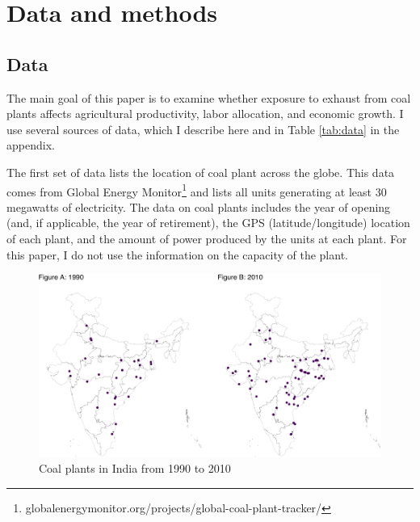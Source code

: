 \documentclass[
]{article}
\begin{document}
\hypertarget{data-and-methods}{%
\section{Data and methods}\label{data-and-methods}}

\label{data}

\hypertarget{data}{%
\subsection{Data}\label{data}}

\label{data2}

The main goal of this paper is to examine whether exposure to exhaust from coal plants affects agricultural productivity, labor allocation, and economic growth. I use several sources of data, which I describe here and in Table \ref{tab:data} in the appendix.

The first set of data lists the location of coal plant across the globe. This data comes from Global Energy Monitor\footnote{globalenergymonitor.org/projects/global-coal-plant-tracker/} and lists all units generating at least 30 megawatts of electricity. The data on coal plants includes the year of opening (and, if applicable, the year of retirement), the GPS (latitude/longitude) location of each plant, and the amount of power produced by the units at each plant. For this paper, I do not use the information on the capacity of the plant.

\begin{figure}
\includegraphics{draft_files/figure-latex/plants-1} \caption[Coal plants in India from 1990 to 2010]{Coal plants in India from 1990 to 2010}\label{fig:plants}
\end{figure}
\end{document}
